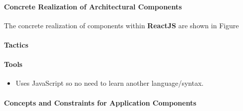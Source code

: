 \paragraph{Concrete Realization of Architectural Components}
The concrete realization of components within \textbf{ReactJS} are shown in Figure
\paragraph{Tactics}
\paragraph{Tools}
\begin{itemize}
	\item Uses JavaScript so no need to learn another language/syntax.
\end{itemize}
\paragraph{Concepts and Constraints for Application Components}